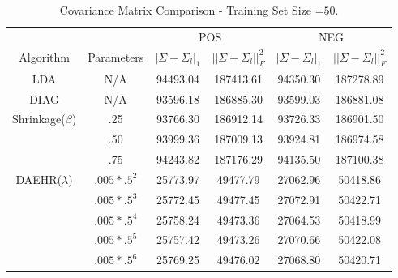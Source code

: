 \documentclass{article}
\begin{document}
\begin{table*}
\footnotesize{
\begin{center}
\caption{Covariance Matrix Comparison - Training Set Size =$50$.}
		\label{tab:table11}
\begin{tabular}{*{6}{c}}
\toprule
 & & \multicolumn{2}{c}{POS} & \multicolumn{2}{c}{NEG}\\
 \cmidrule(lr){3-6}
 
Algorithm & Parameters & $|\Sigma-\Sigma_{l}|_1$ & $||\Sigma-\Sigma_{l}||_F^2$ & $|\Sigma-\Sigma_{l}|_1$ & $||\Sigma-\Sigma_{l}||_F^2$  \\

 \cmidrule(lr){1-2}                        
 \cmidrule(lr){3-4}
\cmidrule(lr){5-6}

    LDA & N/A &   94493.04 & 187413.61  &     94350.30 & 187278.89  \\
 
    \cmidrule(lr){1-2}                        
 \cmidrule(lr){3-4}
\cmidrule(lr){5-6}

    DIAG & N/A &    93596.18 & 186885.30  &     93599.03 & 186881.08   \\
    \cmidrule(lr){1-2}                        
 \cmidrule(lr){3-4}
\cmidrule(lr){5-6}

    \multirow{3}{*}{Shrinkage($\beta$)} 
& .25 &   93766.30& 186912.14 &    93726.33 & 186901.50   \\
& .50 &    93999.36& 187009.13 &    93924.81 & 186974.58     \\
& .75 &    94243.82& 187176.29 &    94135.50 & 187100.38     \\
    \cmidrule(lr){1-2}                        
 \cmidrule(lr){3-4}
\cmidrule(lr){5-6}

    \multirow{5}{*}{DAEHR($\lambda$)} 
     & $.005*.5^{2}$ &    25773.97&	49477.79&    27062.96	& 50418.86    \\
     & $.005*.5^{3}$ &     25772.45&	49477.45&   27072.91	&50422.71  \\     
     & $.005*.5^{4}$ &    25758.24&	49473.36 &   27064.53 &	50418.99  \\
     & $.005*.5^{5}$ &    25757.42&	49473.26&  27070.66&	50422.08     \\
     & $.005*.5^{6}$ &    25769.25&	49476.02 &   27068.80& 	50420.71 \\
 
     \bottomrule
 
\end{tabular}

\end{center}
}
\end{table*}
\end{document}
